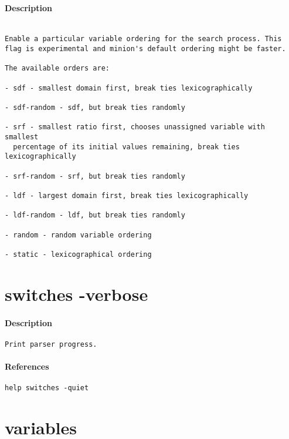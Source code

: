 \paragraph{Description}
{\footnotesize
\begin{verbatim}

Enable a particular variable ordering for the search process. This
flag is experimental and minion's default ordering might be faster.

The available orders are:

- sdf - smallest domain first, break ties lexicographically

- sdf-random - sdf, but break ties randomly

- srf - smallest ratio first, chooses unassigned variable with smallest
  percentage of its initial values remaining, break ties lexicographically

- srf-random - srf, but break ties randomly

- ldf - largest domain first, break ties lexicographically

- ldf-random - ldf, but break ties randomly

- random - random variable ordering

- static - lexicographical ordering
\end{verbatim}
}
\section{switches -verbose}
\paragraph{Description}
{\footnotesize
\begin{verbatim}
Print parser progress.
\end{verbatim}
}
\paragraph{References}
{\footnotesize
\begin{verbatim}
help switches -quiet
\end{verbatim}
}
\section{variables}
